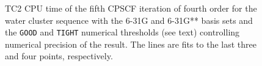 \documentclass[prl,twocolumn,showpacs,twocolumngrid,superbib]{revtex4}
\begin{document}
{\begin{figure}[h]
  \caption{\protect
    TC2 CPU time of the fifth CPSCF iteration of fourth order for
    the water cluster sequence with the 6-31G and 6-31G** 
    basis sets and the {\tt GOOD} and {\tt TIGHT} 
    numerical thresholds (see text) controlling numerical
    precision of the result. The lines are fits to the 
    last three and four points, respectively.
  }\label{fig:Gamma_TC2R_Timing}
\end{figure}

}
\end{document}
